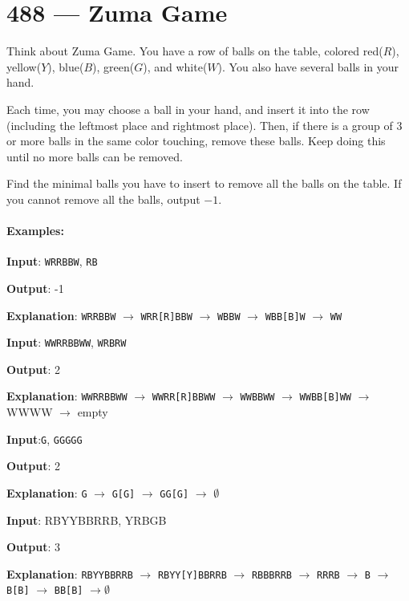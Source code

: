 \section{488 --- Zuma Game}
Think about Zuma Game. You have a row of balls on the table, colored red($ R $), yellow($ Y $), blue($ B $), green($ G $), and white($ W $). You also have several balls in your hand.

Each time, you may choose a ball in your hand, and insert it into the row (including the leftmost place and rightmost place). Then, if there is a group of 3 or more balls in the same color touching, remove these balls. Keep doing this until no more balls can be removed.

Find the minimal balls you have to insert to remove all the balls on the table. If you cannot remove all the balls, output $-1$.

\paragraph{Examples:}

\begin{flushleft}

\textbf{Input}: \texttt{WRRBBW}, \texttt{RB}

\textbf{Output}: -1

\textbf{Explanation}: \texttt{WRRBBW} $\rightarrow$ \texttt{WRR[R]BBW} $\rightarrow$ \texttt{WBBW} $ \rightarrow $ \texttt{WBB[B]W} $ \rightarrow $ \texttt{WW}

\textbf{Input}: \texttt{WWRRBBWW}, \texttt{WRBRW}

\textbf{Output}: 2

\textbf{Explanation}: \texttt{WWRRBBWW} $\longrightarrow$ \texttt{WWRR[R]BBWW} $\longrightarrow$ \texttt{WWBBWW} $\longrightarrow$ \texttt{WWBB[B]WW} $\longrightarrow$ WWWW $\longrightarrow$ empty

\textbf{Input}:\texttt{G}, \texttt{GGGGG}

\textbf{Output}: 2

\textbf{Explanation}: \texttt{G} $\longrightarrow$ \texttt{G[G]} $\longrightarrow$ \texttt{GG[G]} $\longrightarrow$ $\emptyset$


\textbf{Input}: RBYYBBRRB, YRBGB

\textbf{Output}: 3

\textbf{Explanation}: \texttt{RBYYBBRRB} $\longrightarrow$ \texttt{RBYY[Y]BBRRB} $\longrightarrow$ \texttt{RBBBRRB} $\longrightarrow$ \texttt{RRRB} $\longrightarrow$ \texttt{B} $\longrightarrow$ \texttt{B[B]} $\longrightarrow$ \texttt{BB[B]} $\longrightarrow \emptyset$

\end{flushleft}

